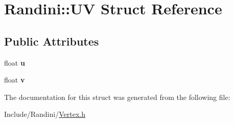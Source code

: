 \hypertarget{structRandini_1_1UV}{
\section{Randini::UV Struct Reference}
\label{structRandini_1_1UV}
}
\subsection*{Public Attributes}
\begin{DoxyCompactItemize}
\item 
\hypertarget{structRandini_1_1UV_a91db8093ca6754e5dd3e536de44d4cc3}{
float {\bfseries u}}
\label{structRandini_1_1UV_a91db8093ca6754e5dd3e536de44d4cc3}

\item 
\hypertarget{structRandini_1_1UV_a02bd106502066df36e4115c7408e8afd}{
float {\bfseries v}}
\label{structRandini_1_1UV_a02bd106502066df36e4115c7408e8afd}

\end{DoxyCompactItemize}


The documentation for this struct was generated from the following file:\begin{DoxyCompactItemize}
\item 
Include/Randini/\hyperlink{Vertex_8h}{Vertex.h}\end{DoxyCompactItemize}
